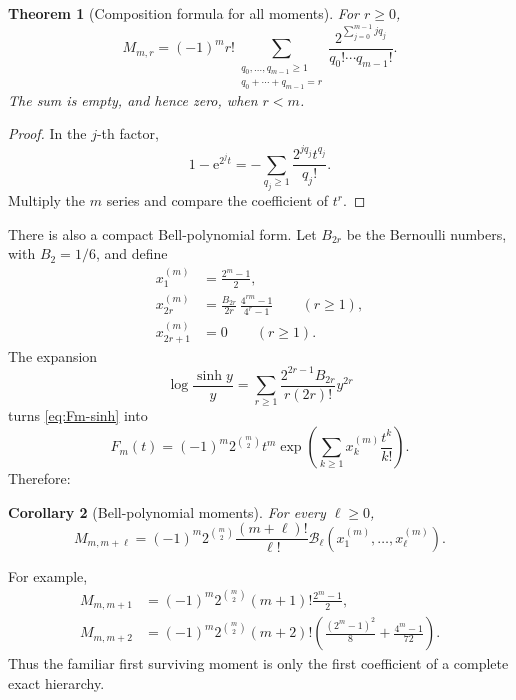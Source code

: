 \documentclass[11pt,oneside]{article}
\newtheorem{theorem}{Theorem}[section]
\newtheorem{corollary}[theorem]{Corollary}
\theoremstyle{definition}
\theoremstyle{remark}
\newcommand{\e}{\mathrm e}
\newcommand{\Bell}{\mathcal B}
\begin{document}
\begin{theorem}[Composition formula for all moments]
\label{thm:all-moments-composition}
For \(r\ge0\),
\begin{equation}
  \boxed{
  M_{m,r}=(-1)^m r!
  \sum_{\substack{q_0,\ldots,q_{m-1}\ge1\\q_0+\cdots+q_{m-1}=r}}
  \frac{2^{\sum_{j=0}^{m-1}jq_j}}{q_0!\cdots q_{m-1}!}.}   \label{eq:all-moments-composition}
\end{equation}
The sum is empty, and hence zero, when \(r<m\).
\end{theorem}

\begin{proof}
In the \(j\)-th factor,
\[
  1-\e^{2^jt}=-\sum_{q_j\ge1}\frac{2^{jq_j}t^{q_j}}{q_j!}.
\]
Multiply the \(m\) series and compare the coefficient of \(t^r\).
\end{proof}

There is also a compact Bell-polynomial form.  Let \(B_{2r}\) be the Bernoulli numbers, with
\(B_2=1/6\), and define
\begin{align}
  x_1^{(m)}&=\frac{2^m-1}{2},                               \label{eq:moment-cumulant-1}\\
  x_{2r}^{(m)}&=\frac{B_{2r}}{2r}\,
       \frac{4^{rm}-1}{4^r-1}\qquad(r\ge1),                \label{eq:moment-cumulant-even}\\
  x_{2r+1}^{(m)}&=0\qquad(r\ge1).                          \label{eq:moment-cumulant-odd}
\end{align}
The expansion
\[
  \log\frac{\sinh y}{y}
   =\sum_{r\ge1}\frac{2^{2r-1}B_{2r}}{r(2r)!}y^{2r}
\]
turns \eqref{eq:Fm-sinh} into
\begin{equation}
  F_m(t)=(-1)^m2^{\binom m2}t^m
  \exp\!\left(\sum_{k\ge1}x_k^{(m)}\frac{t^k}{k!}\right). \label{eq:Fm-Bell-normalized}
\end{equation}
Therefore:

\begin{corollary}[Bell-polynomial moments]
\label{cor:Bell-moments}
For every \(\ell\ge0\),
\begin{equation}
  \boxed{
  M_{m,m+\ell}=(-1)^m2^{\binom m2}
   \frac{(m+\ell)!}{\ell!}
   \Bell_\ell\!\left(x_1^{(m)},\ldots,x_\ell^{(m)}\right).}                   \label{eq:Bell-moments}
\end{equation}
\end{corollary}

For example,
\begin{align}
  M_{m,m+1}
   &=(-1)^m2^{\binom m2}(m+1)!\frac{2^m-1}{2},              \label{eq:moment-mplus1}\\
  M_{m,m+2}
   &=(-1)^m2^{\binom m2}(m+2)!
     \left(\frac{(2^m-1)^2}{8}+\frac{4^m-1}{72}\right).    \label{eq:moment-mplus2}
\end{align}
Thus the familiar first surviving moment is only the first coefficient of a complete exact
hierarchy.
\end{document}
